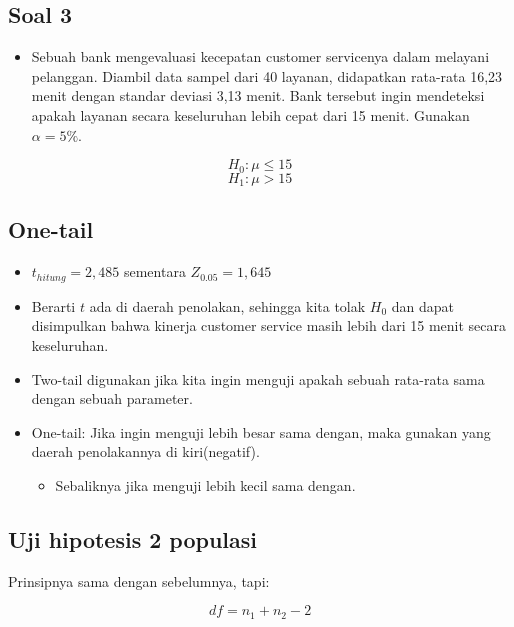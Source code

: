 \documentclass[
  letterpaper,
  DIV=11,
  numbers=noendperiod]{scrartcl}
\providecommand{\tightlist}{%
  \setlength{\itemsep}{0pt}\setlength{\parskip}{0pt}}\usepackage{longtable,booktabs,array}
\begin{document}
\hypertarget{soal-3}{%
\subsection{Soal 3}\label{soal-3}}

\begin{itemize}
\tightlist
\item
  Sebuah bank mengevaluasi kecepatan customer servicenya dalam melayani
  pelanggan. Diambil data sampel dari 40 layanan, didapatkan rata-rata
  16,23 menit dengan standar deviasi 3,13 menit. Bank tersebut ingin
  mendeteksi apakah layanan secara keseluruhan lebih cepat dari 15
  menit. Gunakan \(\alpha=5\%\).
\end{itemize}

\[
H_0: \mu\leq15
\] \[
H_1: \mu>15
\]

\hypertarget{one-tail}{%
\subsection{One-tail}\label{one-tail}}

\begin{itemize}
\item
  \(t_{hitung}=2,485\) sementara \(Z_{0.05}=1,645\)
\item
  Berarti \(t\) ada di daerah penolakan, sehingga kita tolak \(H_0\) dan
  dapat disimpulkan bahwa kinerja customer service masih lebih dari 15
  menit secara keseluruhan.
\item
  Two-tail digunakan jika kita ingin menguji apakah sebuah rata-rata
  sama dengan sebuah parameter.
\item
  One-tail: Jika ingin menguji lebih besar sama dengan, maka gunakan
  yang daerah penolakannya di kiri(negatif).

  \begin{itemize}
  \tightlist
  \item
    Sebaliknya jika menguji lebih kecil sama dengan.
  \end{itemize}
\end{itemize}

\hypertarget{uji-hipotesis-2-populasi}{%
\subsection{Uji hipotesis 2 populasi}\label{uji-hipotesis-2-populasi}}

Prinsipnya sama dengan sebelumnya, tapi:

\[
df=n_1+n_2-2
\]
\end{document}
